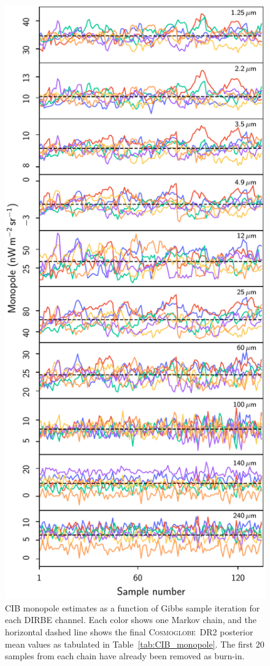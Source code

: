 \documentclass{aa}
\def\Cosmoglobe{\textsc{Cosmoglobe}}
\begin{document}
\begin{figure}
  \centering
  \includegraphics[width=0.98\linewidth]{figs/traceplot_DR2_CIBmono_v4.pdf}
  \caption{CIB monopole estimates as a function of Gibbs sample iteration for each DIRBE channel. Each color shows one Markov chain, and the horizontal dashed line shows the final \Cosmoglobe\ DR2 posterior mean values as tabulated in Table~\ref{tab:CIB_monopole}. The first 20 samples from each chain have already been removed as burn-in.  }
  \label{fig:traceplot}
\end{figure}
\end{document}
